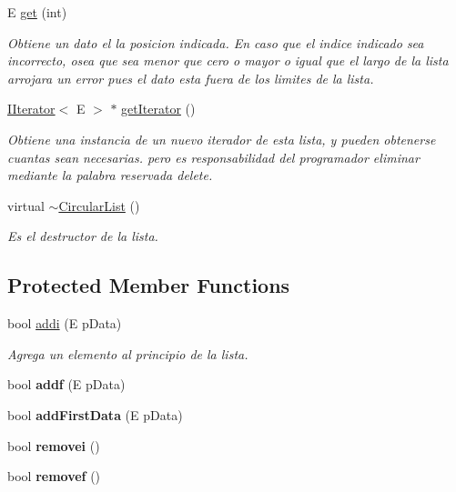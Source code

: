 \begin{DoxyCompactItemize}
E \hyperlink{class_circular_list_ad6783339c7ff05841fc62f74f809644d}{get} (int)
\begin{DoxyCompactList}\small\item\em Obtiene un dato el la posicion indicada. En caso que el indice indicado sea incorrecto, osea que sea menor que cero o mayor o igual que el largo de la lista arrojara un error pues el dato esta fuera de los limites de la lista. \end{DoxyCompactList}\item 
\hyperlink{class_i_iterator}{I\-Iterator}$<$ E $>$ $\ast$ \hyperlink{class_circular_list_a43e6cf1632001b3f409c6ce531529c6e}{get\-Iterator} ()
\begin{DoxyCompactList}\small\item\em Obtiene una instancia de un nuevo iterador de esta lista, y pueden obtenerse cuantas sean necesarias. pero es responsabilidad del programador eliminar mediante la palabra reservada delete. \end{DoxyCompactList}\item 
\hypertarget{class_circular_list_aa65c9665b7d36a5e609752cad0a35dbb}{virtual \hyperlink{class_circular_list_aa65c9665b7d36a5e609752cad0a35dbb}{$\sim$\-Circular\-List} ()}\label{class_circular_list_aa65c9665b7d36a5e609752cad0a35dbb}

\begin{DoxyCompactList}\small\item\em Es el destructor de la lista. \end{DoxyCompactList}\end{DoxyCompactItemize}
\subsection*{Protected Member Functions}
\begin{DoxyCompactItemize}
\item 
bool \hyperlink{class_circular_list_a6f405f4be7946286a958e0b83937b3e2}{addi} (E p\-Data)
\begin{DoxyCompactList}\small\item\em Agrega un elemento al principio de la lista. \end{DoxyCompactList}\item 
\hypertarget{class_circular_list_ad2832eb48d7d69fa5d759c0c16c4bc5e}{bool {\bfseries addf} (E p\-Data)}\label{class_circular_list_ad2832eb48d7d69fa5d759c0c16c4bc5e}

\item 
\hypertarget{class_circular_list_a0a3f318454d748eff1e3b8729aea94bd}{bool {\bfseries add\-First\-Data} (E p\-Data)}\label{class_circular_list_a0a3f318454d748eff1e3b8729aea94bd}

\item 
\hypertarget{class_circular_list_a706dd0ab6fb475bec90d9c40cefa92b1}{bool {\bfseries removei} ()}\label{class_circular_list_a706dd0ab6fb475bec90d9c40cefa92b1}

\item 
\hypertarget{class_circular_list_a1dde06b77306b31eb38fa4b43b6009ab}{bool {\bfseries removef} ()}\label{class_circular_list_a1dde06b77306b31eb38fa4b43b6009ab}

\end{DoxyCompactItemize}
